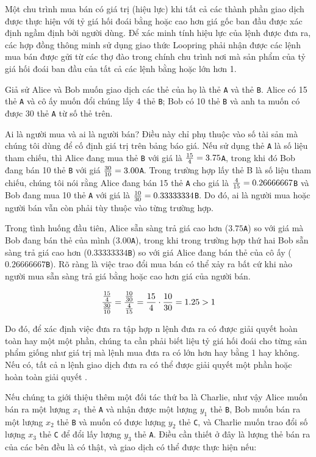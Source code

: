 \documentclass{article}
\begin{document}
\begin{multicols}{2}
Một chu trình mua bán có giá trị (hiệu lực) khi tất cả các thành phần giao dịch được thực hiện với tỷ giá hối đoái bằng hoặc cao hơn giá gốc ban đầu được xác định ngầm định bởi người dùng. Để xác minh tính hiệu lực của lệnh được đưa ra, các hợp đồng thông minh sử dụng giao thức Loopring phải nhận được các lệnh mua bán được gửi từ các thợ đào trong chính chu trình nơi mà sản phẩm của tỷ giá hối đoái ban đầu của tất cả các lệnh bằng hoặc lớn hơn 1.

Giả sử Alice và Bob muốn giao dịch các thẻ của họ là thẻ \verb|A| và thẻ \verb|B|. Alice có 15 thẻ \verb|A| và cô ấy muốn đổi chúng lấy 4 thẻ \verb|B|; Bob có 10 thẻ \verb|B| và anh ta muốn có được 30 thẻ \verb|A| từ số thẻ trên.

Ai là người mua và ai là người bán? Điều này chỉ phụ thuộc vào số tài sản mà chúng tôi dùng để cố định giá trị trên bảng báo giá. Nếu sử dụng thẻ \verb|A| là số liệu tham chiếu, thì Alice đang mua thẻ \verb|B| với giá là  ${15 \over 4} = 3.75$\verb|A|, trong khi đó Bob đang bán 10 thẻ \verb|B| với giá ${30 \over 10} = 3.00$\verb|A|. Trong trường hợp lấy thẻ B là số liệu tham chiếu, chúng tôi nói rằng Alice đang bán 15 thẻ \verb|A| cho giá là ${4\over 15}=0.26666667$\verb|B| và Bob đang mua 10 thẻ \verb|A| với giá là ${10 \over 30}=0.33333334$\verb|B|. Do đó, ai là người mua hoặc người bán vẫn còn phải tùy thuộc vào từng trường hợp.

Trong tình huống đầu tiên, Alice sẵn sàng trả giá cao hơn ($3.75$\verb|A|) so với giá mà Bob đang bán thẻ của mình ($3.00$\verb|A|), trong khi trong trường hợp thứ hai Bob sẵn sàng trả giá cao hơn ($0.33333334$\verb|B|) so với giá Alice đang bán thẻ của cô ấy ($0.26666667$\verb|B|). Rõ ràng là việc trao đổi mua bán có thể xảy ra bất cứ khi nào người mua sẵn sàng trả giá bằng hoặc cao hơn giá của người bán.

\begin{equation}
{{15\over 4} \over {30\over 10}} = {{10\over 30} \over {4\over 15}}={15 \over 4} \cdot {10 \over 30} = 1.25 > 1
\end{equation}

Do đó, để xác định việc đưa ra tập hợp n lệnh đưa ra có được giải quyết hoàn toàn hay một một phần, chúng ta cần phải biết liệu tỷ giá hối đoái cho từng sản phẩm giống như giá trị mà lệnh mua đưa ra có lớn hơn hay bằng 1 hay không. Nếu có, tất cả n lệnh giao dịch đưa ra có thể được giải quyết một phần hoặc hoàn toàn giải quyết \cite{supersymmetry}.

Nếu chúng ta giới thiệu thêm một đối tác thứ ba là Charlie, như vậy Alice muốn bán ra một lượng $x_1$ thẻ \verb|A| và nhận được một lượng $y_1$ thẻ \verb|B|, Bob muốn bán ra một lượng $x_2$ thẻ \verb|B| và muốn có được lượng $y_2$ thẻ \verb|C|, và Charlie muốn trao đổi số lượng $x_3$ thẻ \verb|C| để đổi lấy lượng $y_3$ thẻ \verb|A|. Điều cần thiết ở đây là lượng thẻ bán ra của các bên đều là có thật, và giao dịch có thể được thực hiện nếu:


\end{multicols}
\end{document}
